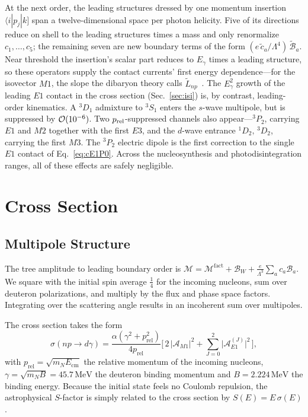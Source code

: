 \documentclass[
  aps,prd,twocolumn,nofootinbib,superscriptaddress,
  longbibliography,floatfix,preprintnumbers
]{revtex4-2}
\newcommand{\prel}{p_{\mathrm{rel}}}
\newcommand{\Egam}{E_{\gamma}}
\newcommand{\Mone}{M1}
\newcommand{\Eone}{E1}
\newcommand{\Mtwo}{M2}
\newcommand{\Ethree}{E3}
\newcommand{\Mthree}{M3}
\begin{document}
At the next order, the leading structures dressed by one momentum insertion
$\langle i|p_{j}|k]$ span a twelve-dimensional space per photon helicity. Five
of its directions reduce on shell to the leading structures times a mass and
only renormalize $c_{1},\dots,c_{5}$; the remaining seven are new boundary
terms of the form $(e\,\tilde{c}_{a}/\Lambda^{4})\,\widetilde{\mathcal{B}}_{a}$.
Near threshold the insertion's scalar part
reduces to $E_{\gamma}$ times a leading structure, so these operators supply
the contact currents' first energy dependence---for the isovector $\Mone$, the
slope the dibaryon theory calls $\tilde{L}_{np}$~\cite{Rupak:1999rk}. The
$\Egam^{2}$ growth of the leading $\Eone$ contact in the cross section
(Sec.~\ref{sec:isi}) is, by contrast, leading-order kinematics.  A $^{3}D_{1}$ admixture to
$^{3}S_{1}$ enters the $s$-wave multipole, but is suppressed by ${\cal O}(10^{-6})$. 
Two $p_{\rm rel}$-suppressed channels also appear---$^{3}P_{2}$, carrying $\Eone$ and
$\Mtwo$ together with the first $\Ethree$,
and the $d$-wave entrance $^{1}D_{2},\,{}^{3}D_{2}$, carrying the first
$\Mthree$. The $^{3}P_{2}$ electric dipole is the first correction to the single
$\Eone$ contact of Eq.~\eqref{eq:cE1P0}. Across the nucleosynthesis and photodisintegration ranges, all of these effects are safely negligible.

\section{Cross Section}
\label{sec:xsec}

\subsection{Multipole Structure}

The tree amplitude to leading boundary order is
$\mathcal{M}=\mathcal{M}^{\mathrm{fact}}+\mathcal{B}_W
+\frac{e}{\Lambda^{3}}\sum_a c_a\mathcal{B}_a$. We square with the initial spin average $\tfrac14$ for the
incoming nucleons, sum over deuteron polarizations, and multiply by the flux and phase space factors.
Integrating over the scattering angle results in an incoherent sum over multipoles.

The cross section takes the form
\begin{equation}
  \sigma(np\to d\gamma)=\frac{\alpha(\gamma^2+\prel^2)}{4\prel}
  \bigg[\,2\,\big|\mathcal{A}_{\Mone}\big|^{2}
   +\sum_{J=0}^{2}\big|\mathcal{A}_{\Eone}^{(J)}\big|^{2}\,\bigg],
  \label{eq:sigma}
\end{equation}
with $\prel=\sqrt{m_N E_{\mathrm{cm}}}$ the relative momentum of the incoming nucleons,
$\gamma=\sqrt{m_N B}=45.7\,\mathrm{MeV}$ the deuteron binding momentum and
$B=2.224\,\mathrm{MeV}$ the binding energy. Because the initial state feels no Coulomb repulsion, the astrophysical $S$-factor is simply related to the cross section by $S(E) = E\,\sigma(E)$.
\end{document}
